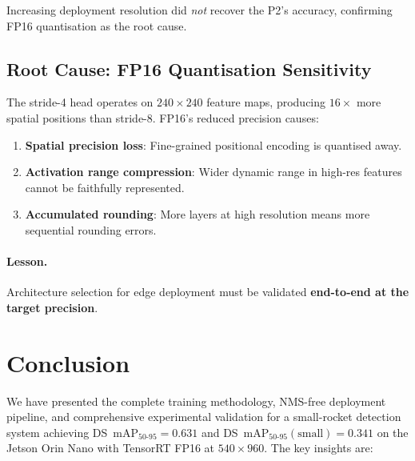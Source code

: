 \documentclass[12pt, titlepage]{article}
\begin{document}
Increasing deployment resolution did \emph{not} recover the P2's accuracy,
confirming FP16 quantisation as the root cause.

\subsection{Root Cause: FP16 Quantisation Sensitivity}

The stride-4 head operates on $240{\times}240$ feature maps, producing
$16{\times}$ more spatial positions than stride-8. FP16's reduced precision
causes:

\begin{enumerate}[leftmargin=*]
  \item \textbf{Spatial precision loss}: Fine-grained positional encoding
        is quantised away.
  \item \textbf{Activation range compression}: Wider dynamic range in
        high-res features cannot be faithfully represented.
  \item \textbf{Accumulated rounding}: More layers at high resolution
        means more sequential rounding errors.
\end{enumerate}

\paragraph{Lesson.}  Architecture selection for edge deployment must be validated \textbf{end-to-end
  at the target precision}.

\section{Conclusion}
\label{sec:conclusion}

We have presented the complete training methodology, NMS-free deployment
pipeline, and comprehensive experimental validation for a small-rocket
detection system achieving DS~mAP$_{50\text{-}95} = \mathbf{0.631}$ and
DS~mAP$_{50\text{-}95}(\text{small}) = \mathbf{0.341}$ on the Jetson Orin Nano
with TensorRT FP16 at $540{\times}960$. The key insights are:
\end{document}

